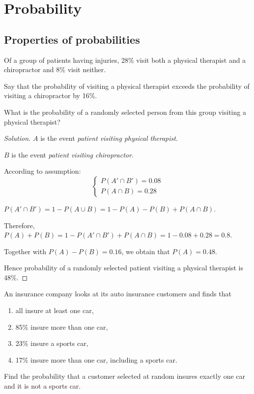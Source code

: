 \documentclass[class=probandstats,crop=false]{standalone}
\begin{document}
\chapter{Probability}

\section{Properties of probabilities}

\begin{exercise}
    \par Of a group of patients having injuries, 28\% visit both a physical therapist and a chiropractor and 8\% visit neither.
    \par Say that the probability of visiting a physical therapist exceeds the probability of visiting a chiropractor by 16\%.
    \par What is the probability of a randomly selected person from this group visiting a physical therapist?
\end{exercise}

\begin{proof}[Solution]
    \par $A$ is the event \textit{patient visiting physical therapist}.
    \par $B$ is the event \textit{patient visiting chiropractor}.
    \bigskip
    \par According to assumption:
    \[
        \begin{cases}
            P(A'\cap B') = 0.08 \\
            P(A\cap B) = 0.28
        \end{cases}
    \]
    \par $P(A'\cap B') = 1 - P(A\cup B) = 1 - P(A) - P(B) + P(A\cap B)$.
    \par Therefore, $P(A) + P(B) = 1 - P(A'\cap B') + P(A\cap B) = 1 - 0.08 + 0.28 = 0.8$.
    \par Together with $P(A) - P(B) = 0.16$, we obtain that $P(A) = 0.48$.
    \par Hence probability of a randomly selected patient visiting a physical therapist is 48\%.
\end{proof}

\begin{exercise}
    \par An insurance company looks at its auto insurance customers and finds that
    \begin{enumerate}[label = (\alph*)]
        \item all insure at least one car,
        \item 85\% insure more than one car,
        \item 23\% insure a sports car,
        \item 17\% insure more than one car, including a sports car.
    \end{enumerate}
    \par Find the probability that a customer selected at random insures exactly one car and it is not a sports car.
\end{exercise}
\end{document}
